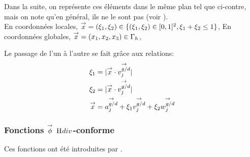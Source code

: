     \begin{minipage}{0.45\textwidth}
      \begin{center}
        \begin{tikzpicture}[scale=1]
          
        \end{tikzpicture}
      \end{center}
      \label{fig:form_int:fon_base:tri}
    \end{minipage} 
    \begin{minipage}{0.54\textwidth}
      Dans la suite, on représente ces éléments dans le même plan tel que ci-contre, mais on note qu'en général, ils ne le sont pas (voir \cite[fig.~2]{rao_electromagnetic_1982}).\\

      En coordonnées locales, \(\vx = (\xi_1,\xi_2) \in \lbrace (\xi_1,\xi_2) \in [0,1]^2, \xi_1 + \xi_2 \le 1\rbrace\),
      En coordonnées globales, \(\vx = (x_1,x_2,x_3) \in \Gamma_h\),

      Le passage de l'un à l'autre se fait grâce aux relations:
      \begin{align}
        \xi_1 &= |\vx \cdot \vect{v_j^{g/d}}| \\
        \xi_2 &= |\vx \cdot \vect{v_j^{g/d}}| \\
        \vx &= \vect{a_j^{g/d}}+ \xi_1 \vect{v_j^{g/d}} + \xi_2 \vect{w_j^{g/d}}
      \end{align}
    \end{minipage} 

    \subsubsection[Fonctions phi Hdiv-conforme]{Fonctions \(\vect{\phi}\) \(\Hdiv\)-conforme}

      Ces fonctions ont été introduites par \cite{raviart_mixed_1977,rao_electromagnetic_1982}.

